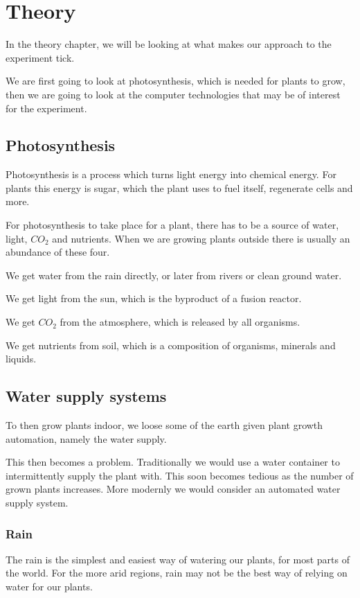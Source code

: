\documentclass[a4paper,12pt,twoside,openright,titlepage]{book}
\begin{document}
\chapter{Theory}
In the theory chapter, we will be looking at what makes our approach to the experiment tick.

We are first going to look at photosynthesis, which is needed for plants to grow, then we are going to look at the computer technologies that may be of interest for the experiment.

\section{Photosynthesis}
Photosynthesis is a process which turns light energy into chemical energy. For plants this energy is sugar, which the plant uses to fuel itself, regenerate cells and more.

For photosynthesis to take place for a plant, there has to be a source of water, light, $CO_2$ and nutrients.
When we are growing plants outside there is usually an abundance of these four.

We get water from the rain directly, or later from rivers or clean ground water.

We get light from the sun, which is the byproduct of a fusion reactor.

We get $CO_2$ from the atmosphere, which is released by all organisms.

We get nutrients from soil, which is a composition of organisms, minerals and liquids.

\section{Water supply systems}
To then grow plants indoor, we loose some of the earth given plant growth automation, namely the water supply.

This then becomes a problem. Traditionally we would use a water container to intermittently supply the plant with. This soon becomes tedious as the number of grown plants increases.
More modernly we would consider an automated water supply system.

\subsection{Rain}
The rain is the simplest and easiest way of watering our plants, for most parts of the world. For the more arid regions, rain may not be the best way of relying on water for our plants.
\end{document}
